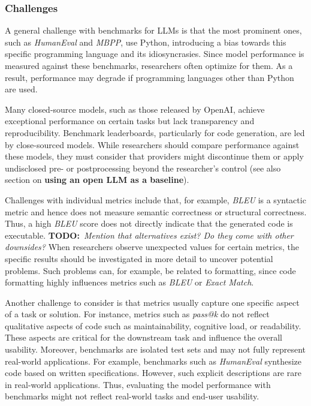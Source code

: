 \documentclass[11pt]{article}
\newcommand{\todo}[1]{{\textbf{TODO:}\ \textit{#1}}} %
\begin{document}

\subsubsection{Challenges}

A general challenge with benchmarks for LLMs is that the most prominent ones, such as \emph{HumanEval} and \emph{MBPP}, use Python, introducing a bias towards this specific programming language and its idiosyncrasies.
Since model performance is measured against these benchmarks, researchers often optimize for them.
As a result, performance may degrade if programming languages other than Python are used.

Many closed-source models, such as those released by OpenAI, achieve exceptional performance on certain tasks but lack transparency and reproducibility.
Benchmark leaderboards, particularly for code generation, are led by close-sourced models.
While researchers should compare performance against these models, they must consider that providers might discontinue them or apply undisclosed pre- or postprocessing beyond the researcher's control (see also section on \textbf{using an open LLM as a baseline}).

Challenges with individual metrics include that, for example, \emph{BLEU} is a syntactic metric and hence does not measure semantic correctness or structural correctness.
Thus, a high \emph{BLEU} score does not directly indicate that the generated code is executable.
\todo{Mention that alternatives exist? Do they come with other downsides?}
When researchers observe unexpected values for certain metrics, the specific results should be investigated in more detail to uncover potential problems.
Such problems can, for example, be related to formatting, since code formatting highly influences metrics such as \emph{BLEU} or \emph{Exact Match}.

Another challenge to consider is that metrics usually capture one specific aspect of a task or solution.
For instance, metrics such as \emph{pass@k} do not reflect qualitative aspects of code such as maintainability, cognitive load, or readability.
These aspects are critical for the downstream task and influence the overall usability.
Moreover, benchmarks are isolated test sets and may not fully represent real-world applications.
For example, benchmarks such as \emph{HumanEval} synthesize code based on written specifications.
However, such explicit descriptions are rare in real-world applications.
Thus, evaluating the model performance with benchmarks might not reflect real-world tasks and end-user usability.
\end{document}
